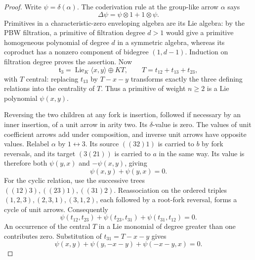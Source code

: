 \documentclass[11pt]{article}
\newcommand{\Lie}{\operatorname{Lie}}
\theoremstyle{definition}
\theoremstyle{remark}
\numberwithin{equation}{section}
\begin{document}
\begin{proof}
Write $\psi=\delta(\alpha)$.  The coderivation rule at the group-like
arrow $\alpha$ says
\[
 \Delta\psi=\psi\otimes1+1\otimes\psi.
\]
Primitives in a characteristic-zero enveloping algebra are its Lie
algebra: by the PBW filtration, a primitive of filtration degree
$d>1$ would give a primitive homogeneous polynomial of degree $d$ in a
symmetric algebra, whereas its coproduct has a nonzero component of
bidegree $(1,d-1)$.  Induction on filtration degree proves the assertion.
Now
\begin{equation}\label{eq:category-three-split}
 \mathfrak t_3=\Lie_K\langle x,y\rangle\oplus K T,
 \qquad T=t_{12}+t_{13}+t_{23},
\end{equation}
with $T$ central: replacing $t_{13}$ by $T-x-y$ transforms exactly the
three defining relations into the centrality of $T$.  Thus a primitive
of weight $n\geq2$ is a Lie polynomial $\psi(x,y)$.

Reversing the two children at any fork is insertion, followed if
necessary by an inner insertion, of a unit arrow in arity two.  Its
$\delta$-value is zero.  The values of unit coefficient arrows add under
composition, and inverse unit arrows have opposite values.  Relabel
$\alpha$ by $1\leftrightarrow3$.  Its source $((32)1)$ is carried to $b$
by fork reversals, and its target $(3(21))$ is carried to $a$ in the same
way.  Its value is therefore both $\psi(y,x)$ and $-\psi(x,y)$, giving
\begin{equation}\label{eq:category-antisymmetry}
 \psi(x,y)+\psi(y,x)=0.
\end{equation}
For the cyclic relation, use the successive trees
$((12)3),((23)1),((31)2)$.  Reassociation on the ordered triples
$(1,2,3),(2,3,1),(3,1,2)$, each followed by a root-fork reversal,
forms a cycle of unit arrows.  Consequently
\[
 \psi(t_{12},t_{23})+\psi(t_{23},t_{31})+
 \psi(t_{31},t_{12})=0.
\]
An occurrence of the central $T$ in a Lie monomial of degree greater
than one contributes zero.  Substitution of $t_{31}=T-x-y$ gives
\begin{equation}\label{eq:category-cyclic}
 \psi(x,y)+\psi(y,-x-y)+\psi(-x-y,x)=0.
\end{equation}


\end{proof}
\end{document}
